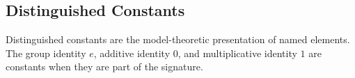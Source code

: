 \subsection*{Distinguished Constants}
\label{subsec:distinguished-constants}

\begin{remark*}[Exposition]
Distinguished constants are the model-theoretic presentation of named elements.
The group identity $e$, additive identity $0$, and multiplicative identity $1$
are constants when they are part of the signature.
\end{remark*}
